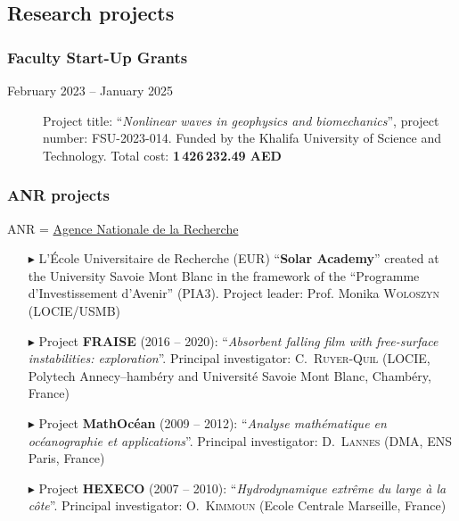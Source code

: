 \separator
\subsection{Research projects}

\subsubsection{Faculty Start-Up Grants}

\begin{description}

  \item[February 2023 -- January 2025] Project title: ``\textit{Nonlinear waves in geophysics and biomechanics}'', project number: FSU-2023-014. Funded by the Khalifa University of Science and Technology. Total cost: \textbf{1\,426\,232.49 AED}

\end{description}

\separator
\subsubsection{ANR projects}

ANR = \href{http://www.agence-nationale-recherche.fr/}{Agence Nationale de la Recherche}

\begin{itemize}

  \item[$\blacktriangleright$] L'\'Ecole Universitaire de Recherche (EUR) ``\textbf{Solar Academy}'' created at the University Savoie Mont Blanc in the framework of the ``Programme d'Investissement d'Avenir'' (PIA3). Project leader: Prof. Monika \textsc{Woloszyn} (LOCIE/USMB)

  \item[$\blacktriangleright$] Project \textbf{FRAISE} (2016 -- 2020): ``\textit{Absorbent falling film with free-surface instabilities: exploration}''. Principal investigator: C.~\textsc{Ruyer}-\textsc{Quil} (LOCIE, Polytech Annecy--hamb\'ery and Universit\'e Savoie Mont Blanc, Chamb\'ery, France)

  \item[$\blacktriangleright$] Project \textbf{MathOc\'ean} (2009 -- 2012): ``\textit{Analyse math\'ematique en oc\'eanographie et applications}''. Principal investigator: D.~\textsc{Lannes} (DMA, ENS Paris, France)
  
  \item[$\blacktriangleright$] Project \textbf{HEXECO} (2007 -- 2010): ``\textit{Hydrodynamique extr\^eme du large \`a la c\^ote}''. Principal investigator: O.~\textsc{Kimmoun} (Ecole Centrale Marseille, France)
  
\end{itemize}

